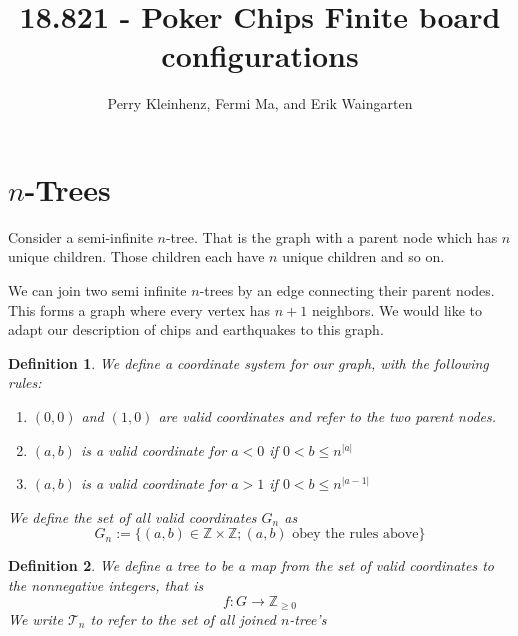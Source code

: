 \documentclass[11pt]{article}
\author{Perry Kleinhenz, Fermi Ma, and Erik Waingarten}
\title{18.821 - Poker Chips Finite board configurations}
\newtheorem{definition}{Definition}
\begin{document}
\maketitle

\section{$n$-Trees}
Consider a semi-infinite $n$-tree. That is the graph with a parent node which has $n$ unique children. Those children each have $n$ unique children and so on. 

We can join two semi infinite $n$-trees by an edge connecting their parent nodes. This forms a graph where every vertex has $n+1$ neighbors. We would like to adapt our description of chips and earthquakes to this graph. 

\begin{definition} We define a coordinate system for our graph, with the following rules:
\begin{enumerate}
	\item $(0,0)$ and $(1,0)$ are valid coordinates and refer to the two parent nodes.
	\item $(a,b)$ is a valid coordinate for $a<0$ if $0<b \leq n^{|a|}$
	\item $(a,b)$ is a valid coordinate for $a>1$ if $0<b \leq n^{|a-1|}$
\end{enumerate}
We define the set of all valid coordinates $G_n$ as 
\begin{equation}
G_n := \{ (a,b) \in \mathbb{Z} \times \mathbb{Z} ; (a,b) \text{ obey the rules above}\}
\end{equation}
\end{definition}

\begin{definition}
We define a tree to be a map from the set of valid coordinates to the nonnegative integers, that is 
\begin{equation}
f:  G\rightarrow \mathbb{Z}_{\geq 0}
\end{equation}
We write $\mathcal{T}_n$ to refer to the set of all joined $n$-tree's 
\end{definition}
\end{document}
